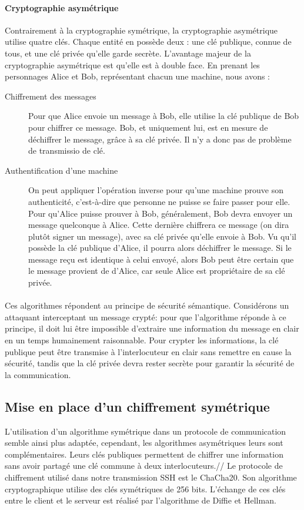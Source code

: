 \paragraph{Cryptographie asymétrique}
Contrairement à la cryptographie symétrique, la cryptographie asymétrique utilise quatre clés. Chaque entité en possède deux : une clé publique, connue de tous, et une clé privée qu'elle garde secrète. L'avantage majeur de la cryptographie asymétrique est qu'elle est à double face. En prenant les personnages Alice et Bob, représentant chacun une machine, nous avons \cite{noauthor_cryptographie_nodate-1} :
\begin{description}
    \item[Chiffrement des messages] Pour que Alice envoie un message à Bob, elle utilise la clé publique de Bob pour chiffrer ce message. Bob, et uniquement lui, est en mesure de déchiffrer le message, grâce à sa clé privée. Il n'y a donc pas de problème de transmissio de clé.
    \item[Authentification d'une machine] On peut appliquer l'opération inverse pour qu'une machine prouve son authenticité, c'est-à-dire que personne ne puisse se faire passer pour elle. Pour qu'Alice puisse prouver à Bob, généralement, Bob devra envoyer un message quelconque à Alice. Cette dernière chiffrera ce message (on dira plutôt signer un message), avec sa clé privée qu'elle envoie à Bob. Vu qu'il possède la clé publique d'Alice, il pourra alors déchiffrer le message. Si le message reçu est identique à celui envoyé, alors Bob peut être certain que le message provient de d'Alice, car seule Alice est propriétaire de sa clé privée.
\end{description}

\paragraph{}
Ces algorithmes répondent au principe de sécurité sémantique\cite{castagnos_cours_2023}. Considérons un attaquant interceptant un message crypté: pour que l'algorithme réponde à ce principe, il doit lui être impossible d'extraire une information du message en clair en un temps humainement raisonnable. Pour crypter les informations, la clé publique peut être transmise à l'interlocuteur en clair sans remettre en cause la sécurité, tandis que la clé privée devra rester secrète pour garantir la sécurité de la communication.\\

\subsection {Mise en place d'un chiffrement symétrique}
L'utilisation d'un algorithme symétrique dans un protocole de communication semble ainsi plus adaptée, cependant, les algorithmes asymétriques leurs sont complémentaires. Leurs clés publiques permettent de chiffrer une information sans avoir partagé une clé commune à deux interlocuteurs.//
Le protocole de chiffrement utilisé dans notre transmission SSH est le ChaCha20. Son algorithme cryptographique utilise des clés symétriques de 256 bits\cite{serrano_chacha20poly1305_2022}. L'échange de ces clés entre le client et le serveur est réalisé par l'algorithme de Diffie et Hellman.


